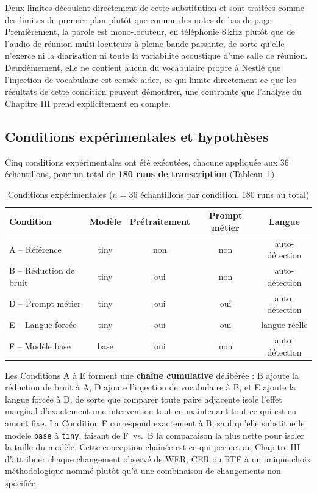 \documentclass[12pt]{report}
\begin{document}
Deux limites découlent directement de cette substitution et sont traitées comme des limites de premier plan plutôt que comme des notes de bas de page. Premièrement, la parole est mono-locuteur, en téléphonie 8\,kHz plutôt que de l'audio de réunion multi-locuteurs à pleine bande passante, de sorte qu'elle n'exerce ni la diarisation ni toute la variabilité acoustique d'une salle de réunion. Deuxièmement, elle ne contient aucun du vocabulaire propre à Nestl\'e que l'injection de vocabulaire est censée aider, ce qui limite directement ce que les résultats de cette condition peuvent démontrer, une contrainte que l'analyse du Chapitre III prend explicitement en compte.
\subsection{Conditions expérimentales et hypothèses}
Cinq conditions expérimentales ont été exécutées, chacune appliquée aux 36 échantillons, pour un total de \textbf{180 runs de transcription} (Tableau~\ref{tab:conditions}).
\begin{table}[H]
\centering
\small
\begin{tabular}{|l|c|c|c|c|}
\hline
\textbf{Condition} & \textbf{Modèle} & \textbf{Prétraitement} & \textbf{Prompt métier} & \textbf{Langue} \\ \hline
A -- Référence & tiny & non & non & auto-détection \\ \hline
B -- Réduction de bruit & tiny & oui & non & auto-détection \\ \hline
D -- Prompt métier & tiny & oui & oui & auto-détection \\ \hline
E -- Langue forcée & tiny & oui & oui & langue réelle \\ \hline
F -- Modèle base & base & oui & non & auto-détection \\ \hline
\end{tabular}
\caption{Conditions expérimentales ($n=36$ échantillons par condition, 180 runs au total)}
\label{tab:conditions}
\end{table}
Les Conditions A à E forment une \textbf{chaîne cumulative} délibérée : B ajoute la réduction de bruit à A, D ajoute l'injection de vocabulaire à B, et E ajoute la langue forcée à D, de sorte que comparer toute paire adjacente isole l'effet marginal d'exactement une intervention tout en maintenant tout ce qui est en amont fixe. La Condition F correspond exactement à B, sauf qu'elle substitue le modèle \texttt{base} à \texttt{tiny}, faisant de F~vs.~B la comparaison la plus nette pour isoler la taille du modèle. Cette conception chaînée est ce qui permet au Chapitre III d'attribuer chaque changement observé de WER, CER ou RTF à un unique choix méthodologique nommé plutôt qu'à une combinaison de changements non spécifiée.
\end{document}
